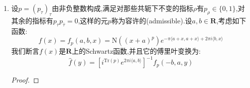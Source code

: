\begin{enumerate}
\begin{proof}
    	不妨用$f$替换$f_A$,记$g(x)=\sum_{k\in\mathbb{Z}^n}f(x+k)$,按照$f$是Schwartz函数,当$x$跑遍一个紧集时对几乎所有的$k\in\mathbb{Z}^n$有$|f(x+k)|\cdot|k|^{n+1}\le C$,于是从$\sum_{k\not=0}\frac{1}{|k|^{n+1}}$收敛得到$g$是绝对且局部一致收敛的.并且这件事对$g$的任意导数成立,于是$g$是光滑函数.它是周期的,对任意$\textbf{n}\in\mathbb{Z}^n$有$g(x+\textbf{n})=g(x)$.于是它有傅里叶展开$g(x)=\sum_{\textbf{n}\in\mathbb{Z}^n}a_{\textbf{n}}e^{2\pi i{^t\textbf{n}}x}$,它的系数是熟知的:
    	\begin{align*}
    		a_{\textbf{n}}&=\int_{[0,1]^n}g(x)e^{-2\pi i{^t\textbf{n}}x}\mathrm{d}x\\&=\sum_{k\in\mathbb{Z}^n}\int_{[0,1]^n}f(x+k)e^{-2\pi i{^t\textbf{n}}x}\mathrm{d}x\\&=\widehat{f}(\textbf{n})
    	\end{align*}
        于是有:
        $$\sum_{\textbf{n}\in\mathbb{Z}^n}f(\textbf{n})=g(0)=\sum_{\textbf{n}\in\mathbb{Z}^n}a_{\textbf{n}}=\sum_{\textbf{n}\in\mathbb{Z}^n}\widehat{f}(\textbf{n})$$ 	
    \end{proof}
    \item 设$p=(p_{\tau})_{\tau}$由非负整数构成,满足对那些共轭下不变的指标$\rho$有$p_{\rho}\in\{0,1\}$,对其余的指标有$p_{\tau}p_{\overline{\tau}}=0$,这样的元$p$称为容许的(admissible).设$a,b\in\textbf{R}$,考虑如下函数:
    $$f(x)=f_p(a,b,x)=\mathrm{N}\left((x+a)^p\right)e^{-\pi\langle a+x,a+x\rangle+2\pi i\langle b,x\rangle}$$
    我们断言$f(x)$是$\textbf{R}$上的Schwartz函数,并且它的傅里叶变换为:
    $$\widehat{f}(y)=\left[i^{\mathrm{Tr}(p)}e^{2\pi i\langle a,b\rangle}\right]^{-1}f_p(-b,a,y)$$
    \begin{proof}
    	

\end{proof}
\end{enumerate}
